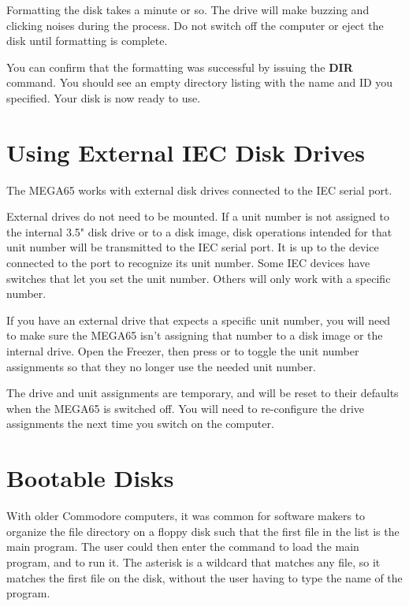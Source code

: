 Formatting the disk takes a minute or so. The drive will make buzzing and clicking noises during the process. Do not switch off the computer or eject the disk until formatting is complete.

You can confirm that the formatting was successful by issuing the {\bf DIR} command. You should see an empty directory listing with the name and ID you specified. Your disk is now ready to use.


\section{Using External IEC Disk Drives}

The MEGA65 works with external disk drives connected to the IEC serial port.

External drives do not need to be mounted. If a unit number is not assigned to the internal 3.5" disk drive or to a disk image, disk operations intended for that unit number will be transmitted to the IEC serial port. It is up to the device connected to the port to recognize its unit number. Some IEC devices have switches that let you set the unit number. Others will only work with a specific number.

If you have an external drive that expects a specific unit number, you will need to make sure the MEGA65 isn't assigning that number to a disk image or the internal drive. Open the Freezer, then press  or  to toggle the unit number assignments so that they no longer use the needed unit number.

The drive and unit assignments are temporary, and will be reset to their defaults when the MEGA65 is switched off. You will need to re-configure the drive assignments the next time you switch on the computer.


\section{Bootable Disks}

With older Commodore computers, it was common for software makers to organize the file directory on a floppy disk such that the first file in the list is the main program. The user could then enter the command  to load the main program, and  to run it. The asterisk is a wildcard that matches any file, so it matches the first file on the disk, without the user having to type the name of the program.

